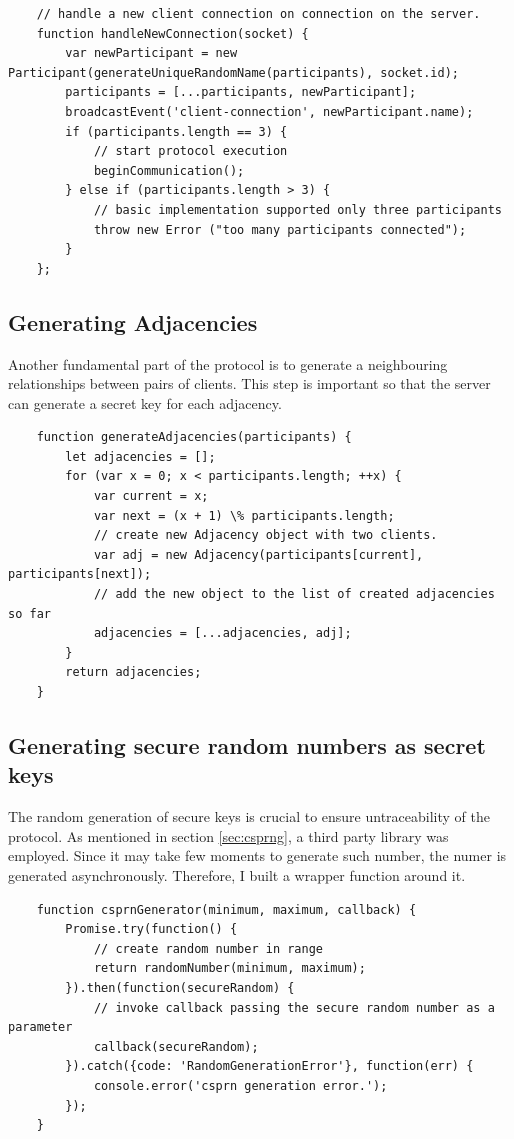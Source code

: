 \begin{lstlisting}
    // handle a new client connection on connection on the server.
    function handleNewConnection(socket) {
        var newParticipant = new Participant(generateUniqueRandomName(participants), socket.id);
        participants = [...participants, newParticipant];
        broadcastEvent('client-connection', newParticipant.name);
        if (participants.length == 3) {
            // start protocol execution
            beginCommunication();
        } else if (participants.length > 3) {
            // basic implementation supported only three participants
            throw new Error ("too many participants connected");
        }
    };
\end{lstlisting}


\subsection{Generating Adjacencies}
Another fundamental part of the protocol is to generate a neighbouring relationships between pairs of clients. This step is important so that the server can generate a secret key for each adjacency. 

\begin{lstlisting}
    function generateAdjacencies(participants) {
        let adjacencies = [];
        for (var x = 0; x < participants.length; ++x) {
            var current = x;
            var next = (x + 1) \% participants.length;
            // create new Adjacency object with two clients.
            var adj = new Adjacency(participants[current], participants[next]);
            // add the new object to the list of created adjacencies so far
            adjacencies = [...adjacencies, adj];
        }
        return adjacencies;
    }
\end{lstlisting}

\subsection{Generating secure random numbers as secret keys}
The random generation of secure keys is crucial to ensure untraceability of the protocol. As mentioned in section \ref{sec:csprng}, a third party library was employed. Since it may take few moments to generate such number, the numer is generated asynchronously. Therefore, I built a wrapper function around it.
\begin{lstlisting}
    function csprnGenerator(minimum, maximum, callback) {
        Promise.try(function() {
            // create random number in range
            return randomNumber(minimum, maximum);
        }).then(function(secureRandom) {
            // invoke callback passing the secure random number as a parameter
            callback(secureRandom);
        }).catch({code: 'RandomGenerationError'}, function(err) {
            console.error('csprn generation error.');
        });
    }
\end{lstlisting}

